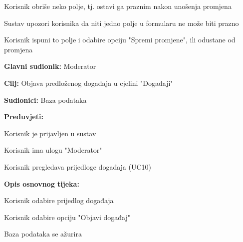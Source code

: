 \begin{packed_item}
\begin{packed_item}
\begin{packed_enum}
							\end{packed_enum}
							
							\item[4.b] Korisnik obriše neko polje, tj. ostavi ga praznim nakon unošenja promjena
							\item[] \begin{packed_enum}
								
								\item Sustav upozori korisnika da niti jedno polje u formularu ne može biti prazno
								\item Korisnik ispuni to polje i odabire opciju "Spremi promjene", ili odustane od promjena
								
							\end{packed_enum}
							
							
						\end{packed_item}
						\end{packed_item}
					\noindent {}
					\begin{packed_item}
	
						\item \textbf{Glavni sudionik: }Moderator
						\item  \textbf{Cilj:} Objava predloženog događaja u cjelini "Događaji"
						\item  \textbf{Sudionici:} Baza podataka
						\item  \textbf{Preduvjeti:}
						\item[] \begin{packed_enum}
							\item Korisnik je prijavljen u sustav
							\item Korisnik ima ulogu "Moderator"
							\item Korisnik pregledava prijedloge događaja (UC10)
						\end{packed_enum}
						\item  \textbf{Opis osnovnog tijeka:}
						
						\item[] \begin{packed_enum}
	
							\item Korisnik odabire prijedlog događaja 
							\item Korisnik odabire opciju "Objavi događaj"
							\item Baza podataka se ažurira
							
						\end{packed_enum}
						\end{packed_item}
